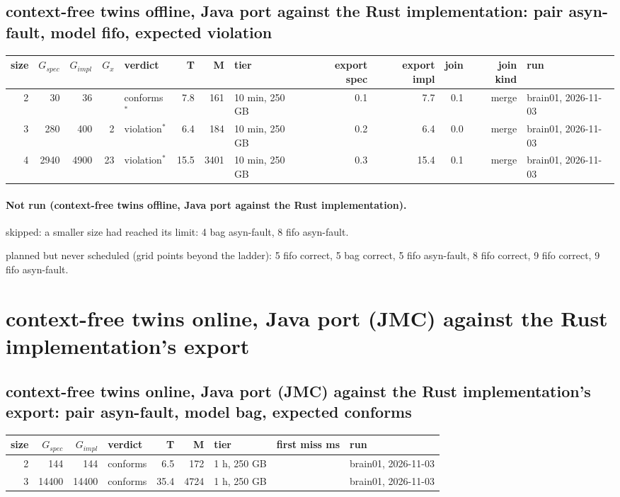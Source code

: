 \documentclass[10pt]{article}
\begin{document}
\subsection*{context-free twins offline, Java port against the Rust implementation: pair \textsf{asyn-fault}, model fifo, expected violation}
\begin{longtable}{@{}rrrrlrrlrrrrl@{}}
\toprule
size & $G_{\mathit{spec}}$ & $G_{\mathit{impl}}$ & $G_x$ & verdict & T & M & tier & export spec & export impl & join & join kind & run \\
\midrule
\endhead
\color{blue} 2 & 30 & 36 &  & conforms$^{\ast}$ & 7.8 & 161 & 10 min, 250 GB & 0.1 & 7.7 & 0.1 & merge & brain01, 2026-11-03 \\
\color{blue} 3 & 280 & 400 & 2 & violation$^{\ast}$ & 6.4 & 184 & 10 min, 250 GB & 0.2 & 6.4 & 0.0 & merge & brain01, 2026-11-03 \\
\color{blue} 4 & 2940 & 4900 & 23 & violation$^{\ast}$ & 15.5 & 3401 & 10 min, 250 GB & 0.3 & 15.4 & 0.1 & merge & brain01, 2026-11-03 \\
\bottomrule
\end{longtable}
\paragraph{Not run (context-free twins offline, Java port against the Rust implementation).}
skipped: a smaller size had reached its limit: 4 bag asyn-fault, 8 fifo asyn-fault.\par
planned but never scheduled (grid points beyond the ladder): 5 fifo correct, 5 bag correct, 5 fifo asyn-fault, 8 fifo correct, 9 fifo correct, 9 fifo asyn-fault.\par
\section*{context-free twins online, Java port (JMC) against the Rust implementation's export}
\subsection*{context-free twins online, Java port (JMC) against the Rust implementation's export: pair \textsf{asyn-fault}, model bag, expected conforms}
\begin{longtable}{@{}rrrlrrlrl@{}}
\toprule
size & $G_{\mathit{spec}}$ & $G_{\mathit{impl}}$ & verdict & T & M & tier & first miss ms & run \\
\midrule
\endhead
\color{blue} 2 & 144 & 144 & conforms & 6.5 & 172 & 1 h, 250 GB &  & brain01, 2026-11-03 \\
\color{blue} 3 & 14400 & 14400 & conforms & 35.4 & 4724 & 1 h, 250 GB &  & brain01, 2026-11-03 \\
\bottomrule
\end{longtable}
\end{document}
